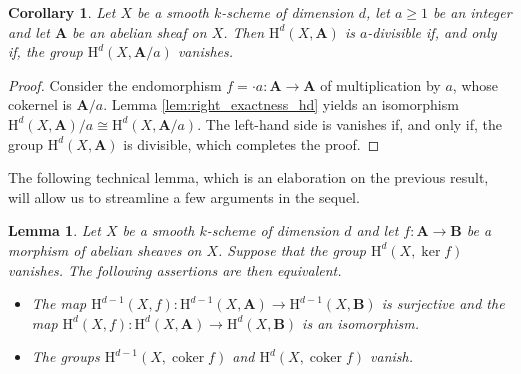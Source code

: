 \documentclass[11pt,leqno]{amsart}
\newcommand{\coker}{\operatorname{coker}}
\renewcommand{\1}{{\rm 1\hspace*{-0.4ex}%
\rule{0.1ex}{1.52ex}\hspace*{0.2ex}}}
\newcommand{\Hr}{{\mathrm {H}}}
\newcommand{\<}[1]{{\langle}#1 {\rangle}}
\newcommand{\Abf}{\mathbf{A}}
\newcommand{\Bbf}{\mathbf{B}}
\theoremstyle{plain}
\newtheorem{lem}[thm]{Lemma}
\newtheorem{cor}[thm]{Corollary}
\theoremstyle{definition}
\theoremstyle{remark}
\numberwithin{equation}{section}
\begin{document}
\begin{cor}\label{cor:divisibility_vanishing_multiplication_by_n_non_unique}
Let $X$ be a smooth $k$-scheme of dimension $d$, let $a\geq 1$ be an integer and let $\Abf$ be an abelian sheaf on $X$. Then $\Hr^d(X,\Abf)$ is $a$-divisible if, and only if, the group $\Hr^d(X,\Abf/a)$ vanishes.
\end{cor}

\begin{proof}
Consider the endomorphism $f=\cdot a:\Abf\to\Abf$ of multiplication by $a$, whose cokernel is $\Abf/a$. Lemma \ref{lem:right_exactness_hd} yields an isomorphism $\Hr^d(X,\Abf)/a\cong\Hr^d(X,\Abf/a)$. The left-hand side is vanishes if, and only if, the group $\Hr^d(X,\Abf)$ is divisible, which completes the proof.
\end{proof}

The following technical lemma, which is an elaboration on the previous result, will allow us to streamline a few arguments in the sequel.

\begin{lem}\label{lem:unique_divisibility_vanishing}
Let $X$ be a smooth $k$-scheme of dimension $d$ and let $f:\Abf\rightarrow\Bbf$ be a morphism of abelian sheaves on $X$. Suppose that the group $\Hr^d(X,\ker f)$ vanishes. The following assertions are then equivalent.
\begin{itemize}
	\item[(1)] The map $\Hr^{d-1}(X,f):\Hr^{d-1}(X,\Abf)\rightarrow\Hr^{d-1}(X,\Bbf)$ is surjective and the map $\Hr^d(X,f):\Hr^d(X,\Abf)\rightarrow\Hr^d(X,\Bbf)$ is an isomorphism.
	\item[(2)] The groups $\Hr^{d-1}(X,\coker f)$ and $\Hr^{d}(X,\coker f)$ vanish.
\end{itemize}
\vspace{-\itemsep}
\end{lem}
\end{document}
